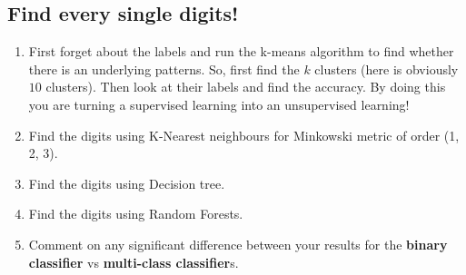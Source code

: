 \documentclass[12pt,letterpaper]{article}
\begin{document}
\subsection*{Find every single digits!}
\begin{enumerate}
\item First forget about the labels and run the k-means algorithm to find whether there is an underlying patterns. So, first find the $k$ clusters (here is obviously $10$ clusters). Then look at their labels and find the accuracy. By doing this you are turning a supervised learning into an unsupervised learning! 

\item Find the digits using K-Nearest neighbours for Minkowski metric of order (1, 2, 3). 
\item Find the digits using Decision tree. 
\item Find the digits using Random Forests.

\item Comment on any significant difference between your results for the \textbf{binary classifier} vs \textbf{multi-class classifier}s.
\end{enumerate}
\end{document}
